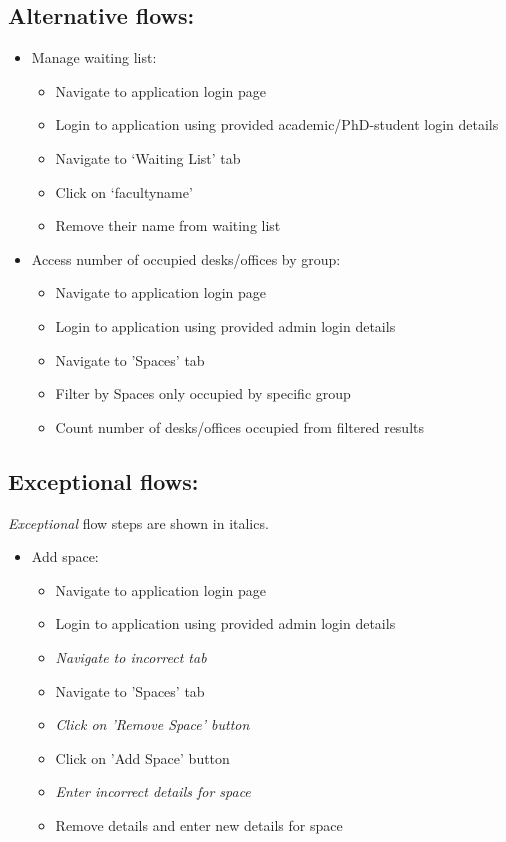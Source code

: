 \documentclass[11pt,a4paper]{article}
\begin{document}
\subsection{Alternative flows:}
\begin{itemize}
  \item Manage waiting list:
    \begin{itemize}
      \item Navigate to application login page
      \item Login to application using provided academic/PhD-student login details
      \item Navigate to ‘Waiting List’ tab
      \item Click on ‘facultyname’
      \item Remove their name from waiting list
    \end{itemize}
  \item Access number of occupied desks/offices by group:
    \begin{itemize}
        \item Navigate to application login page
        \item Login to application using provided admin login details
        \item Navigate to 'Spaces' tab
        \item Filter by Spaces only occupied by specific group
        \item Count number of desks/offices occupied from filtered results
    \end{itemize}
\end{itemize}

\subsection{Exceptional flows:}
\textit{Exceptional} flow steps are shown in italics.
\begin{itemize}
  \item Add space:
    \begin{itemize}
       \item Navigate to application login page
       \item Login to application using provided admin login details
       \item \textit{Navigate to incorrect tab}
       \item Navigate to 'Spaces' tab
       \item \textit{Click on 'Remove Space' button}
       \item Click on 'Add Space' button
       \item \textit{Enter incorrect details for space}
       \item Remove details and enter new details for space
    \end{itemize}
\end{itemize}
\end{document}
